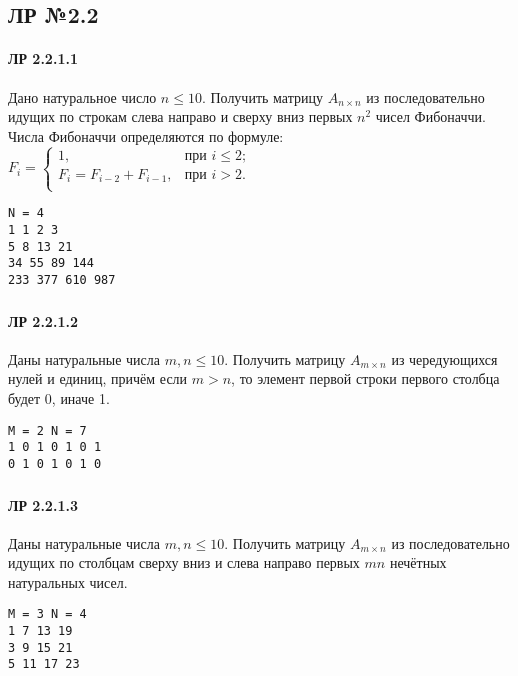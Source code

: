 \documentclass[12pt,a4paper]{report}
\begin{document}
\subsection*{ЛР №2.2}
\noindent %
\begin{minipage}{0.75\textwidth}
\paragraph*{ЛР 2.2.1.1} 
Дано натуральное число $n \le 10$. Получить матрицу $A_{n \times n}$ из последовательно идущих по строкам слева направо и сверху вниз первых $n^2$ чисел Фибоначчи. Числа Фибоначчи определяются по формуле:
$F_i=\begin{cases}
1, & \text{при } i \le 2; \\
F_i = F_{i-2} + F_{i-1}, & \text{при } i > 2. \\
\end{cases}$
\end{minipage}
\hfill
\begin{minipage}{0.2\textwidth}
\begin{verbatim}
N = 4
1 1 2 3
5 8 13 21
34 55 89 144
233 377 610 987
\end{verbatim}
\end{minipage}

\subsubsection*{} \noindent
\begin{minipage}{0.75\textwidth}
\paragraph*{ЛР 2.2.1.2}
Даны натуральные числа $m,n \le 10$. Получить матрицу $A_{m \times n}$ из чередующихся нулей и единиц, причём если $m>n$, то элемент первой строки первого столбца будет 0, иначе 1.
\end{minipage}
\hfill
\begin{minipage}{0.2\textwidth}
\begin{verbatim}
M = 2 N = 7
1 0 1 0 1 0 1
0 1 0 1 0 1 0
\end{verbatim}
\end{minipage}

\subsubsection*{} \noindent
\begin{minipage}{0.75\textwidth}
\paragraph*{ЛР 2.2.1.3} 
Даны натуральные числа $m,n \le 10$. Получить матрицу $A_{m \times n}$ из последовательно идущих по столбцам сверху вниз и слева направо первых $mn$ нечётных натуральных чисел.
\end{minipage}
\hfill
\begin{minipage}{0.2\textwidth}
\begin{verbatim}
M = 3 N = 4
1 7 13 19
3 9 15 21
5 11 17 23
\end{verbatim}
\end{minipage}
\end{document}
